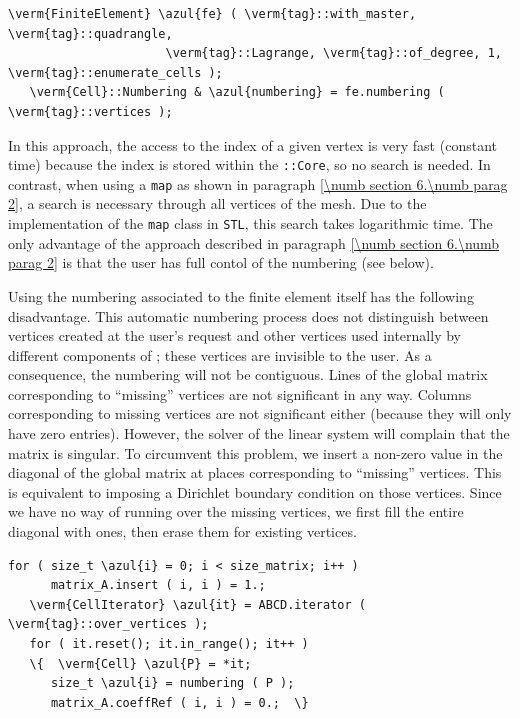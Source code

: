 \begin{Verbatim}[commandchars=\\\{\},formatcom=\small\tt,frame=single,
   label=parag-\ref{\numb section 6.\numb parag 4}.cpp,rulecolor=\color{coment},
   baselinestretch=0.94,framesep=2mm                                            ]
   \verm{FiniteElement} \azul{fe} ( \verm{tag}::with_master, \verm{tag}::quadrangle,
                      \verm{tag}::Lagrange, \verm{tag}::of_degree, 1, \verm{tag}::enumerate_cells );
   \verm{Cell}::Numbering & \azul{numbering} = fe.numbering ( \verm{tag}::vertices );
\end{Verbatim}

In this approach, the access to the index of a given vertex is very fast (constant time)
because the index is stored within the {\small\tt{}::Core}, so no search is needed.
In contrast, when using a {\small\tt map} as shown in paragraph \ref{\numb section 6.\numb parag 2},
a search is necessary through all vertices of the mesh.
Due to the implementation of the {\small\tt map} class in {\tt STL}, this search takes
logarithmic time.
The only advantage of the approach described in paragraph \ref{\numb section 6.\numb parag 2}
is that the user has full contol of the numbering (see below).

Using the numbering associated to the finite element itself has the following disadvantage.
This automatic numbering process does not distinguish between vertices created at the user's
request and other vertices used internally by different components of {\maniFEM};
these vertices are invisible to the user.
As a consequence, the numbering will not be contiguous.
Lines of the global matrix corresponding to ``missing'' vertices are not significant in any way.
Columns corresponding to missing vertices are not significant either (because they will only
have zero entries).
However, the solver of the linear system will complain that the matrix is singular.
To circumvent this problem, we insert a non-zero value in the diagonal of the global matrix
at places corresponding to ``missing'' vertices.
This is equivalent to imposing a Dirichlet boundary condition on those vertices.
Since we have no way of running over the missing vertices, we first fill the entire
diagonal with ones, then erase them for existing vertices.

\begin{Verbatim}[commandchars=\\\{\},formatcom=\small\tt,frame=single,
   label=parag-\ref{\numb section 6.\numb parag 4}.cpp,rulecolor=\color{coment},
   baselinestretch=0.94,framesep=2mm                                            ]
   for ( size_t \azul{i} = 0; i < size_matrix; i++ )
      matrix_A.insert ( i, i ) = 1.;
   \verm{CellIterator} \azul{it} = ABCD.iterator ( \verm{tag}::over_vertices );
   for ( it.reset(); it.in_range(); it++ )
   \{  \verm{Cell} \azul{P} = *it;
      size_t \azul{i} = numbering ( P );
      matrix_A.coeffRef ( i, i ) = 0.;  \}
\end{Verbatim}

